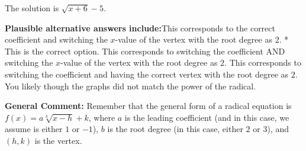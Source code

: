\documentclass{extbook}[14pt]
\begin{document}
\begin{enumerate}
{The solution is \( \sqrt{x + 6} - 5 \).\begin{enumerate}[label=\Alph*.]
\textbf{Plausible alternative answers include:}This corresponds to the correct coefficient and switching the $x$-value of the vertex with the root degree as $2$.
* This is the correct option.
This corresponds to switching the coefficient AND switching the $x$-value of the vertex with the root degree as $2$.
This corresponds to switching the coefficient and having the correct vertex with the root degree as $2$.
You likely though the graphs did not match the power of the radical.
\end{enumerate}

\textbf{General Comment:} Remember that the general form of a radical equation is $ f(x) = a \sqrt[b]{x - h} + k$, where $a$ is the leading coefficient (and in this case, we assume is either $1$ or $-1$), $b$ is the root degree (in this case, either $2$ or $3$), and $(h, k)$ is the vertex.
}
\end{enumerate}
\end{document}
